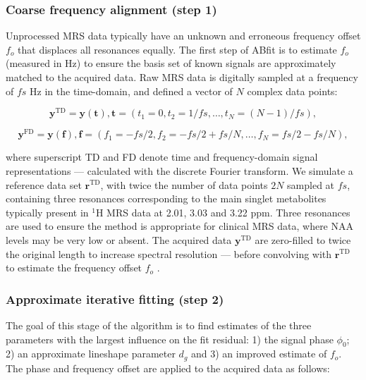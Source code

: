\documentclass[num-refs]{wiley-article}
\begin{document}
\subsubsection{Coarse frequency alignment (step 1)}
Unprocessed MRS data typically have an unknown and erroneous frequency offset $f_{o}$ that displaces all resonances equally. The first step of ABfit is to estimate $f_{o}$ (measured in Hz) to ensure the basis set of known signals are approximately matched to the acquired data. Raw MRS data is digitally sampled at a frequency of $\mathit{fs}$ Hz in the time-domain, and defined a vector of $N$ complex data points:

\begin{equation}
  \mathbf{y}^{\mathrm{TD}} = \mathbf{y}(\mathbf{t}), \mathbf{t}=(t_{1}=0,t_{2} =1/\mathit{fs},\ldots,t_{N}=(N-1)/\mathit{fs}),
\end{equation}

\begin{equation}
  \mathbf{y}^{\mathrm{FD}} = \mathbf{y}(\mathbf{f}), \mathbf{f}=(f_{1}=-\mathit{fs}/2,f_{2} =-\mathit{fs}/2 + \mathit{fs}/N ,\ldots,f_{N}=\mathit{fs}/2 - \mathit{fs}/N),
\end{equation}

where superscript TD and FD denote time and frequency-domain signal representations --- calculated with the discrete Fourier transform. We simulate a reference data set $\mathbf{r}^{\mathrm{TD}}$, with twice the number of data points $2N$ sampled at $\mathit{fs}$, containing three resonances corresponding to the main singlet metabolites typically present in $^1\mathrm{H}$ MRS data at 2.01, 3.03 and 3.22 ppm. Three resonances are used to ensure the method is appropriate for clinical MRS data, where NAA levels may be very low or absent. The acquired data $\mathbf{y}^{\mathrm{TD}}$ are zero-filled to twice the original length to increase spectral resolution --- before convolving with  $\mathbf{r}^{\mathrm{TD}}$ to estimate the frequency offset $f_{o}$ \cite{Provencher1993}.

\subsubsection{Approximate iterative fitting (step 2)}
The goal of this stage of the algorithm is to find estimates of the three parameters with the largest influence on the fit residual: 1) the signal phase $\phi_{0}$; 2) an approximate lineshape parameter $d_{g}$ and 3) an improved estimate of $f_{o}$. The phase and frequency offset are applied to the acquired data as follows:
\end{document}
